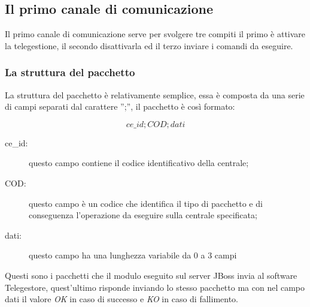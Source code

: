 \subsection{Il primo canale di comunicazione}
Il primo canale di comunicazione serve per svolgere tre compiti il primo è attivare la telegestione, il secondo disattivarla ed il terzo inviare i comandi da eseguire.
\subsubsection{La struttura del pacchetto}
La struttura del pacchetto è relativamente semplice, essa è composta da una serie di campi separati dal carattere '';'', il pacchetto è così formato:
\begin{center}
	$$ce\_id;COD;dati$$
\end{center}
\begin{description}
	\item[ce\_id:] questo campo contiene il codice identificativo della centrale;
	\item[COD:] questo campo è un codice che identifica il tipo di pacchetto e di conseguenza l'operazione da eseguire sulla centrale specificata;
	\item[dati:] questo campo ha una lunghezza variabile da 0 a 3 campi
\end{description}
Questi sono i pacchetti che il modulo eseguito sul server JBoss invia al software Telegestore, quest'ultimo risponde inviando lo stesso pacchetto ma con nel campo dati il valore \emph{OK} in caso di successo e \emph{KO} in caso di fallimento.
